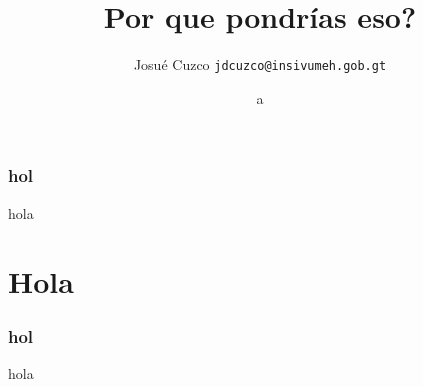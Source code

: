 \documentclass{beamer}
\title{Por que pondrías eso?}
\date[ISPN ’80]{a}
\author[Cuzco]{Josué Cuzco \texttt{jdcuzco@insivumeh.gob.gt}}
\begin{document}
\begin{frame}
\titlepage
\end{frame}

\begin{frame}
    \frametitle{hol}

    hola

\end{frame}

\section{Hola}

\begin{frame}
    \frametitle{hol}

    hola

\end{frame}
\end{document}
